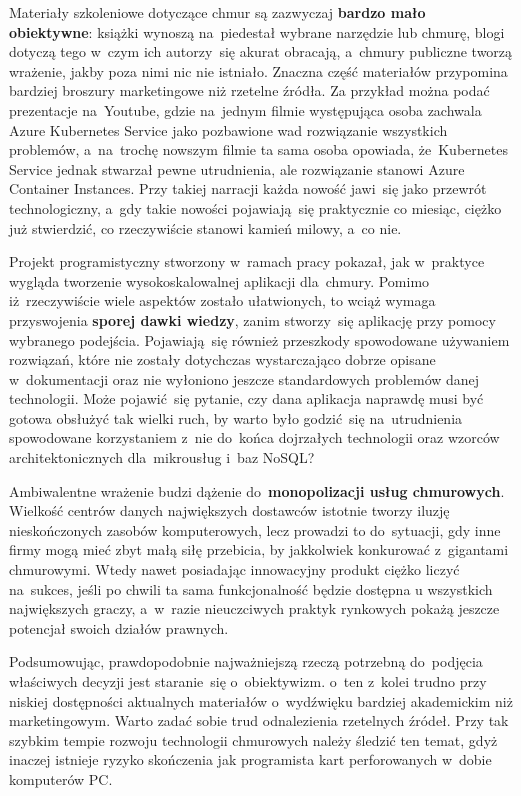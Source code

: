\documentclass[12pt,a4paper,twoside,titlepage,openright]{book}
\begin{document}
Materiały szkoleniowe dotyczące chmur są zazwyczaj \textbf{bardzo mało obiektywne}: książki wynoszą na~piedestał wybrane narzędzie lub chmurę, blogi dotyczą tego w~czym ich autorzy~się akurat obracają, a~chmury publiczne tworzą wrażenie, jakby poza nimi nic nie istniało. Znaczna część materiałów przypomina bardziej broszury marketingowe niż rzetelne źródła. Za przykład można podać prezentacje na~Youtube, gdzie na~jednym filmie występująca osoba zachwala Azure Kubernetes Service jako pozbawione wad rozwiązanie wszystkich problemów, a~na~trochę nowszym filmie ta sama osoba opowiada, że~Kubernetes Service jednak stwarzał pewne utrudnienia, ale rozwiązanie stanowi Azure Container Instances. Przy takiej narracji każda nowość jawi~się jako przewrót technologiczny, a~gdy takie nowości pojawiają~się praktycznie co miesiąc, ciężko już stwierdzić, co rzeczywiście stanowi kamień milowy, a~co nie.

Projekt programistyczny stworzony w~ramach pracy pokazał, jak w~praktyce wygląda tworzenie wysokoskalowalnej aplikacji dla~chmury. Pomimo iż~rzeczywiście wiele aspektów zostało ułatwionych, to wciąż wymaga przyswojenia \textbf{sporej dawki wiedzy}, zanim stworzy~się aplikację przy pomocy wybranego podejścia. Pojawiają~się również przeszkody spowodowane używaniem rozwiązań, które nie zostały dotychczas wystarczająco dobrze opisane w~dokumentacji oraz nie wyłoniono jeszcze standardowych problemów danej technologii. Może pojawić~się pytanie, czy dana aplikacja naprawdę musi być gotowa obsłużyć tak wielki ruch, by warto było godzić~się na~utrudnienia spowodowane korzystaniem z~nie do~końca dojrzałych technologii oraz wzorców architektonicznych dla~mikrousług i~baz NoSQL? 

Ambiwalentne wrażenie budzi dążenie do~\textbf{monopolizacji usług chmurowych}. Wielkość centrów danych największych dostawców istotnie tworzy iluzję nieskończonych zasobów komputerowych, lecz prowadzi to do~sytuacji, gdy inne firmy mogą mieć zbyt małą siłę przebicia, by jakkolwiek konkurować z~gigantami chmurowymi. Wtedy nawet posiadając innowacyjny produkt ciężko liczyć na~sukces, jeśli po chwili ta sama funkcjonalność będzie dostępna u wszystkich największych graczy, a~w~razie nieuczciwych praktyk rynkowych pokażą jeszcze potencjał swoich działów prawnych.

Podsumowując, prawdopodobnie najważniejszą rzeczą potrzebną do~podjęcia właściwych decyzji jest staranie~się o~obiektywizm. o~ten z~kolei trudno przy niskiej dostępności aktualnych materiałów o~wydźwięku bardziej akademickim niż marketingowym. Warto zadać sobie trud odnalezienia rzetelnych źródeł. Przy tak szybkim tempie rozwoju technologii chmurowych należy śledzić ten temat, gdyż inaczej istnieje ryzyko skończenia jak programista kart perforowanych w~dobie komputerów PC. 





 
\listoffigures

\listoftables



\printbibliography
 
\end{document}

